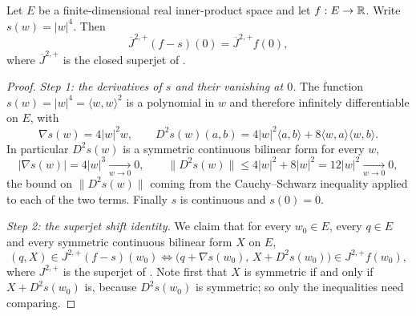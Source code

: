 \begin{lemma}
Let $E$ be a finite-dimensional real inner-product space and let $f:E\to\mathbb{R}$.
Write $s(w)=|w|^4$. Then
\[
  \overline J^{2,+}(f-s)(0)=\overline J^{2,+}f(0),
\]
where $\overline J^{2,+}$ is the closed superjet of .
\end{lemma}
\begin{proof}
\emph{Step 1: the derivatives of $s$ and their vanishing at $0$.}
The function $s(w)=|w|^4=\langle w,w\rangle^2$ is a polynomial in $w$ and
therefore infinitely differentiable on $E$, with
\[
  \nabla s(w)=4|w|^2w,\qquad
  D^2s(w)(a,b)=4|w|^2\langle a,b\rangle+8\langle w,a\rangle\langle w,b\rangle .
\]
In particular $D^2s(w)$ is a symmetric continuous bilinear form for every $w$,
\[
  |\nabla s(w)|=4|w|^3\xrightarrow[w\to0]{}0,
  \qquad
  \|D^2s(w)\|\le4|w|^2+8|w|^2=12|w|^2\xrightarrow[w\to0]{}0,
\]
the bound on $\|D^2s(w)\|$ coming from the Cauchy--Schwarz inequality applied to
each of the two terms. Finally $s$ is continuous and $s(0)=0$.

\emph{Step 2: the superjet shift identity.}
We claim that for every $w_0\in E$, every $q\in E$ and every symmetric
continuous bilinear form $X$ on $E$,
\begin{equation}\label{eq:csq-shift}
  (q,X)\in J^{2,+}(f-s)(w_0)
  \iff
  \bigl(q+\nabla s(w_0),\,X+D^2s(w_0)\bigr)\in J^{2,+}f(w_0),
\end{equation}
where $J^{2,+}$ is the superjet of . Note first that $X$ is
symmetric if and only if $X+D^2s(w_0)$ is, because $D^2s(w_0)$ is symmetric; so
only the inequalities need comparing.


\end{proof}
